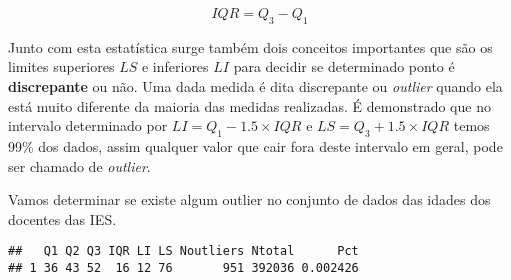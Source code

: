 \documentclass[11pt,]{style/krantz}
\makeatletter
\newenvironment{Shaded}{\begin{snugshade}}{\end{snugshade}}
\newcommand{\DataTypeTok}[1]{\textcolor[rgb]{0.13,0.29,0.53}{#1}}
\newcommand{\FloatTok}[1]{\textcolor[rgb]{0.00,0.00,0.81}{#1}}
\newcommand{\KeywordTok}[1]{\textcolor[rgb]{0.13,0.29,0.53}{\textbf{#1}}}
\newcommand{\NormalTok}[1]{#1}
\newcommand{\OperatorTok}[1]{\textcolor[rgb]{0.81,0.36,0.00}{\textbf{#1}}}
\newcommand{\StringTok}[1]{\textcolor[rgb]{0.31,0.60,0.02}{#1}}
\newenvironment{kframe}{%
\medskip{}
\setlength{\fboxsep}{.8em}
 \def\at@end@of@kframe{}%
 \ifinner\ifhmode%
  \def\at@end@of@kframe{\end{minipage}}%
  \begin{minipage}{\columnwidth}%
 \fi\fi%
 \def\FrameCommand##1{\hskip\@totalleftmargin \hskip-\fboxsep
 \colorbox{shadecolor}{##1}\hskip-\fboxsep
     \hskip-\linewidth \hskip-\@totalleftmargin \hskip\columnwidth}%
 \MakeFramed {\advance\hsize-\width
   \@totalleftmargin\z@ \linewidth\hsize
   \@setminipage}}%
 {\par\unskip\endMakeFramed%
 \at@end@of@kframe}
\renewenvironment{Shaded}{\begin{kframe}}{\end{kframe}}
\theoremstyle{definition}
\theoremstyle{definition}
\theoremstyle{definition}
\theoremstyle{remark}
\let\BeginKnitrBlock\begin \let\EndKnitrBlock\end
\makeatother
\begin{document}
\[IQR = Q_3-Q_1\]

Junto com esta estatística surge também dois conceitos importantes que são os limites superiores \(LS\) e inferiores \(LI\) para decidir se determinado ponto é \textbf{discrepante} ou não. Uma dada medida é dita discrepante ou \emph{outlier} quando ela está muito diferente da maioria das medidas realizadas. É demonstrado que no intervalo determinado por \(LI=Q_1-1.5 \times IQR\) e \(LS=Q_3+1.5 \times IQR\) temos 99\% dos dados, assim qualquer valor que cair fora deste intervalo em geral, pode ser chamado de \emph{outlier}.

\BeginKnitrBlock{example}
\protect\hypertarget{exm:unnamed-chunk-69}{}{\label{exm:unnamed-chunk-69} }Vamos determinar se existe algum outlier no conjunto de dados das idades dos docentes das IES.
\EndKnitrBlock{example}

\begin{Shaded}
\end{Shaded}

\begin{verbatim}
##   Q1 Q2 Q3 IQR LI LS Noutliers Ntotal      Pct
## 1 36 43 52  16 12 76       951 392036 0.002426
\end{verbatim}
\end{document}
